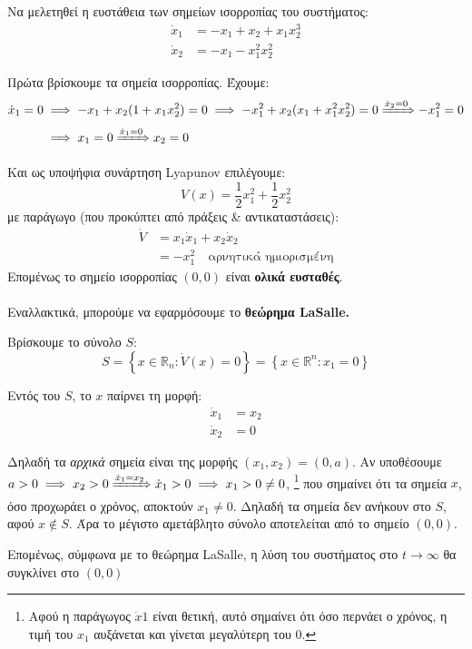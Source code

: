 \documentclass[11pt,a4paper,notitlepage,fleqn]{article}
\begin{document}
\begin{exercise}[Εφαρμογή]
	Να μελετηθεί η ευστάθεια των σημείων ισορροπίας του συστήματος:
	\begin{align*}
		\dot x_1 &= -x_1+x_2 + x_1x_2^3 \\
		\dot x_2 &= -x_1 -x_1^2x_2^2
	\end{align*}
	
	\tcblower
	Πρώτα βρίσκουμε τα σημεία ισορροπίας. Έχουμε:
	\begin{align*}
		\dot x_1 = 0 &\implies
		-x_1 + x_2(1+x_1x_2^2) = 0
		\implies -x_1^2 + x_2(x_1+x_1^2x_2^2) = 0
		\xRightarrow{\dot x_2 = 0} -x_1^2 = 0
		\\
		&\implies x_1 = 0
		\xRightarrow{\dot x_1 = 0} x_2 = 0
	\end{align*}
	
	Και ως υποψήφια συνάρτηση Lyapunov επιλέγουμε:
	\[
	V(x) = \frac{1}{2}x_1^2 + \frac{1}{2}x_2^2
	\]
	με παράγωγο (που προκύπτει από πράξεις \& αντικαταστάσεις):
	\begin{align*}
		\dot V &= x_1\dot x_1 + x_2\dot x_2 \\ &= -x_1^2 \quad \text{αρνητικά ημιορισμένη}
	\end{align*}
	Επομένως το σημείο ισορροπίας \( (0,0) \) είναι \textbf{ολικά ευσταθές}.
	
	\paragraph{}
	Εναλλακτικά, μπορούμε να εφαρμόσουμε το \textbf{θεώρημα
		LaSalle.}
		
	Βρίσκουμε το σύνολο \( S \):
	\[
	S = \left\lbrace  x\in\mathbb R_n : \dot V(x) = 0 \right\rbrace
	= \left\lbrace x \in \mathbb R^n : x_1 = 0 \right\rbrace
	\]
	
	Εντός του \( S \), το \( x \) παίρνει τη μορφή:
	\begin{align*}
		\dot x_1 &= x_2 \\ \dot x_2 &= 0
	\end{align*}
	
	Δηλαδή τα \textit{αρχικά} σημεία είναι της μορφής \( (x_1,x_2) = (0,a) \). Αν
	υποθέσουμε \( a > 0 \implies x_2 > 0 \xRightarrow{\dot x_1 = x_2} \dot x_1 > 0 \implies
	x_1 > 0 \neq 0 \), \footnote{Αφού η παράγωγος $\dot x1$ είναι θετική, αυτό σημαίνει ότι όσο περνάει ο χρόνος, η τιμή του  $x_1$  αυξάνεται και γίνεται μεγαλύτερη του 0.} που σημαίνει ότι
	τα σημεία \( x \), όσο προχωράει ο χρόνος, αποκτούν
	\( x_1 \neq 0 \). Δηλαδή τα σημεία δεν ανήκουν στο \( S \), αφού
	\( x \notin S \). Άρα το μέγιστο αμετάβλητο σύνολο αποτελείται από
	το σημείο
	\( (0,0) \).
	
	Επομένως, σύμφωνα με το θεώρημα LaSalle, η λύση του συστήματος στο \( t \to \infty \) θα συγκλίνει στο \( (0,0) \)
\end{exercise}
\end{document}
